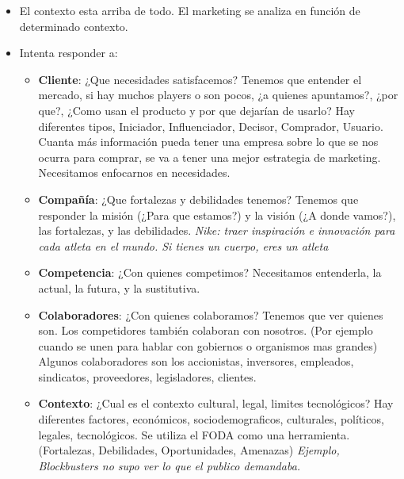 \documentclass[titlepage,a4paper]{article}
\begin{document}
\begin{itemize}
\item El contexto esta arriba de todo. El marketing se analiza en función de determinado contexto.
\item Intenta responder a:
\begin{itemize}
\item \textbf{Cliente}: ¿Que necesidades satisfacemos? Tenemos que entender el mercado, si hay muchos players o son pocos, ¿a quienes apuntamos?, ¿por que?, ¿Como usan el producto y por que dejarían de usarlo? Hay diferentes tipos, Iniciador, Influenciador, Decisor, Comprador, Usuario. Cuanta más información pueda tener una empresa sobre lo que se nos ocurra para comprar, se va a tener una mejor estrategia de marketing. Necesitamos enfocarnos en necesidades.
\item \textbf{Compañía}: ¿Que fortalezas y debilidades tenemos? Tenemos que responder la misión (¿Para que estamos?) y la visión (¿A donde vamos?), las fortalezas, y las debilidades. \textit{Nike: traer inspiración e innovación para cada atleta en el mundo. Si tienes un cuerpo, eres un atleta}
\item \textbf{Competencia}: ¿Con quienes competimos? Necesitamos entenderla, la actual, la futura, y la sustitutiva.
\item \textbf{Colaboradores}: ¿Con quienes colaboramos? Tenemos que ver quienes son. Los competidores también colaboran con nosotros. (Por ejemplo cuando se unen para hablar con gobiernos o organismos mas grandes) Algunos colaboradores son los accionistas, inversores, empleados, sindicatos, proveedores, legisladores, clientes.
\item \textbf{Contexto}: ¿Cual es el contexto cultural, legal, limites tecnológicos? Hay diferentes factores, económicos, sociodemograficos, culturales, políticos, legales, tecnológicos. Se utiliza el FODA como una herramienta. (Fortalezas, Debilidades, Oportunidades, Amenazas) \textit{Ejemplo, Blockbusters no supo ver lo que el publico demandaba. }
\end{itemize}
\end{itemize}
\end{document}
